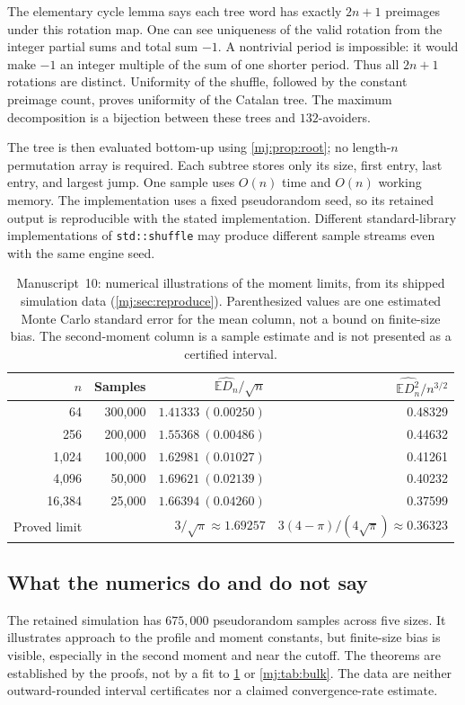 \documentclass[11pt,a4paper]{article}
\theoremstyle{definition}\newaliascnt{definition}{theorem}
\theoremstyle{remark}\newaliascnt{remark}{theorem}
\newcommand{\ljE}{\mathbb E}
\begin{document}
The elementary cycle lemma says each tree word has exactly $2n+1$ preimages
under this rotation map. One can see uniqueness of the valid rotation from
the integer partial sums and total sum $-1$. A nontrivial period is
impossible: it would make $-1$ an integer multiple of the sum of one shorter
period. Thus all $2n+1$ rotations are distinct. Uniformity of the shuffle,
followed by the constant preimage count, proves uniformity of the Catalan
tree. The maximum decomposition is a bijection between these trees and
$132$-avoiders.

The tree is then evaluated bottom-up using \cref{mj:prop:root}; no length-$n$
permutation array is required. Each subtree stores only its size, first
entry, last entry, and largest jump. One sample uses $O(n)$ time and $O(n)$
working memory. The implementation uses a fixed pseudorandom seed, so its
retained output is reproducible with the stated implementation. Different
standard-library implementations of \texttt{std::shuffle} may produce
different sample streams even with the same engine seed.

\begin{table}[tbp]
\centering
\caption{Manuscript~10: numerical illustrations of the moment limits, from
its shipped simulation data (\cref{mj:sec:reproduce}). Parenthesized values are one
estimated Monte Carlo standard error for the mean column, not a bound on
finite-size bias. The second-moment column is a sample estimate and is not
presented as a certified interval.}
\label{mj:tab:simulation}
\begin{tabular}{rrrr}
\toprule
$n$ & Samples & $\widehat{\ljE D_n}/\sqrt n$ &
 $\widehat{\ljE D_n^2}/n^{3/2}$\\
\midrule
64    & 300,000 & $1.41333\ (0.00250)$ & 0.48329\\
256   & 200,000 & $1.55368\ (0.00486)$ & 0.44632\\
1,024 & 100,000 & $1.62981\ (0.01027)$ & 0.41261\\
4,096 & 50,000  & $1.69621\ (0.02139)$ & 0.40232\\
16,384& 25,000  & $1.66394\ (0.04260)$ & 0.37599\\
\midrule
Proved limit & & $3/\sqrt\pi\approx1.69257$ &
 $3(4-\pi)/(4\sqrt\pi)\approx0.36323$\\
\bottomrule
\end{tabular}
\end{table}

\subsection{What the numerics do and do not say}
The retained simulation has $675{,}000$ pseudorandom samples across five
sizes. It illustrates approach to the profile and moment constants, but
finite-size bias is visible, especially in the second moment and near the
cutoff. The theorems are established by the proofs, not by a fit to
\cref{mj:tab:simulation} or \cref{mj:tab:bulk}. The data are neither
outward-rounded interval certificates nor a claimed convergence-rate
estimate.
\end{document}
